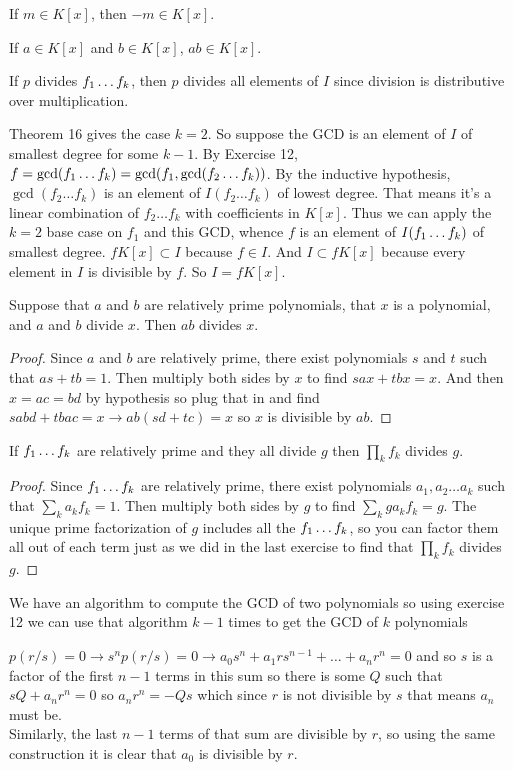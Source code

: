 \documentclass[11pt, oneside]{article}   	%
\begin{document}
\item If $m \in K[x]$, then $-m \in K[x]$.
\item If $a \in K[x]$ and $b \in K[x]$, $ab \in K[x]$.
\item If $p$ divides $f_1 \ldots f_k$, then $p$ divides all elements of $I$ since division is distributive over multiplication.
\item Theorem 16 gives the case $k=2$. So suppose the GCD is an element of $I$ of smallest degree for some $k-1$. By Exercise 12, $f = \gcd(f_1 \ldots f_k) = \gcd(f_1, \gcd(f_2 \ldots f_k))$. By the inductive hypothesis, $\gcd(f_2 \ldots f_k)$ is an element of $I(f_2 \ldots f_k)$ of lowest degree. That means it's a linear combination of $f_2 \ldots f_k $ with coefficients in $K[x]$. Thus we can apply the $k=2$ base case on $f_1$ and this GCD, whence $f$ is an element of $I(f_1 \ldots f_k)$ of smallest degree.
$fK[x]\subset I$ because $f \in I$. And $I \subset fK[x]$ because every element in $I$ is divisible by $f$. So $I = fK[x]$.
\ee
\item Suppose that $a$ and $b$ are relatively prime polynomials, that $x$ is a polynomial, and $a$ and $b$ divide $x$. Then $ab$ divides $x$. \begin{proof} Since $a$ and $b$ are relatively prime, there exist polynomials $s$ and $t$ such that $as + tb  = 1$. Then multiply both sides by $x$ to find $sax + tbx = x$. And then $x = ac = bd$ by hypothesis so plug that in and find $sabd + tbac = x \rightarrow ab(sd + tc) = x$ so $x$ is divisible by $ab$. \end{proof}
\item If $f_1 \ldots f_k$ are relatively prime and they all divide $g$ then $\prod_kf_k$ divides $g$. \begin{proof} Since $f_1 \ldots f_k$ are relatively prime, there exist polynomials $a_1, a_2 \ldots a_k$ such that $\sum_ka_kf_k = 1$. Then multiply both sides by $g$ to find $\sum_kga_kf_k = g$. The unique prime factorization of $g$ includes all the $f_1 \ldots f_k$, so you can factor them all out of each term just as we did in the last exercise to find that $\prod_kf_k$ divides $g$.  \end{proof}
\item \be \item We have an algorithm to compute the GCD of two polynomials so using exercise 12 we can use that algorithm $k-1$ times to get the GCD of $k$ polynomials
\item
\ee
\item \be \item $p(r/s) = 0 \rightarrow s^np(r/s) = 0 \rightarrow a_0s^n + a_1rs^{n-1} + \ldots + a_nr^n = 0$ and so $s$ is a factor of the first $n-1$ terms in this sum so there is some $Q$ such that $sQ + a_nr^n = 0$ so $a_nr^n = -Qs$ which since $r$ is not divisible by $s$ that means $a_n$ must be. \\ Similarly, the last $n-1$ terms of that sum are divisible by $r$, so using the same construction it is clear that $a_0$ is divisible by $r$. 
\end{document}
